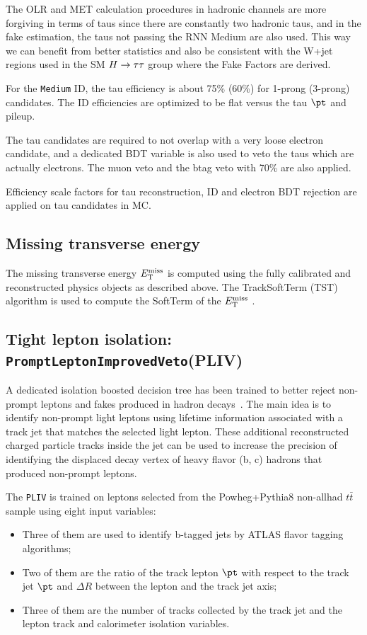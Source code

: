 The OLR and MET calculation procedures in hadronic channels are more forgiving in terms of taus since there are constantly two hadronic taus, and in the fake estimation, the taus not passing the RNN Medium are also used. This way we can benefit from better statistics and also be consistent with the W+jet regions used in the SM $H \rightarrow \tau\tau$ group where the Fake Factors are derived.

For the \texttt{Medium} ID, the tau efficiency is about 75\% (60\%) for 1-prong (3-prong) candidates. The ID efficiencies are optimized to be flat versus the tau $\pt$ and pileup.

The tau candidates are required to not overlap with a very loose electron candidate, and a dedicated BDT variable is also used to veto the taus which are actually electrons. The muon veto and the btag veto with 70\% are also applied. 

Efficiency scale factors for tau reconstruction, ID and electron BDT rejection \cite{TauCP} are applied on tau candidates in MC.

\subsection{Missing transverse energy}
The missing transverse energy $E_{\text{T}}^{\text{miss}}$ is computed using the fully calibrated and reconstructed physics objects as described above. The TrackSoftTerm (TST) algorithm is used to compute the SoftTerm of the $E_{\text{T}}^{\text{miss}}$ \cite{MET}. 

\subsection{Tight lepton isolation: \texttt{PromptLeptonImprovedVeto}(PLIV)}
\label{sec:Pliv}
A dedicated isolation boosted decision tree has been trained to better reject non-prompt leptons and fakes produced in hadron decays~\cite{ATL-COM-PHYS-2018-410}. The main idea is to identify non-prompt light leptons using lifetime information associated with a track jet that matches the selected light lepton. These additional reconstructed charged particle tracks inside the jet can be used to increase the precision of identifying the displaced decay vertex of heavy flavor (b, c) hadrons that produced non-prompt leptons.

The \texttt{PLIV} is trained on leptons selected from the Powheg+Pythia8 non-allhad $t\bar t$ sample using eight input variables:
\begin{itemize}
\item Three of them are used to identify b-tagged jets by ATLAS flavor tagging algorithms;
\item Two of them are the ratio of the track lepton $\pt$ with respect to the track jet $\pt$ and $\Delta R$ between the lepton and the track jet axis;
\item Three of them are the number of tracks collected by the track jet and the lepton track and calorimeter isolation variables. 
\end{itemize}


